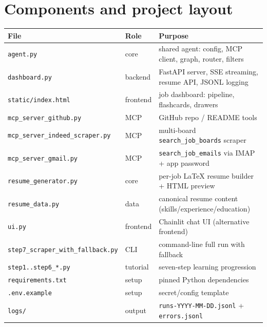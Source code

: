 \documentclass[11pt,a4paper]{article}
\newcommand{\file}[1]{\texttt{\small #1}}
\newcommand{\tool}[1]{\texttt{#1}}
\begin{document}
\section{Components and project layout}
\label{sec:files}

\begin{center}
\begin{tabular}{@{}llp{7.4cm}@{}}
\toprule
\textbf{File} & \textbf{Role} & \textbf{Purpose}\\
\midrule
\file{agent.py} & core & shared agent: config, MCP client, graph, router, filters\\
\file{dashboard.py} & backend & FastAPI server, SSE streaming, resume API, JSONL logging\\
\file{static/index.html} & frontend & job dashboard: pipeline, flashcards, drawers\\
\file{mcp\_server\_github.py} & MCP & GitHub repo / README tools\\
\file{mcp\_server\_indeed\_scraper.py} & MCP & multi-board \tool{search\_job\_boards} scraper\\
\file{mcp\_server\_gmail.py} & MCP & \tool{search\_job\_emails} via IMAP + app password\\
\file{resume\_generator.py} & core & per-job LaTeX resume builder + HTML preview\\
\file{resume\_data.py} & data & canonical resume content (skills/experience/education)\\
\file{ui.py} & frontend & Chainlit chat UI (alternative frontend)\\
\file{step7\_scraper\_with\_fallback.py} & CLI & command-line full run with fallback\\
\file{step1..step6\_*.py} & tutorial & seven-step learning progression\\
\file{requirements.txt} & setup & pinned Python dependencies\\
\file{.env.example} & setup & secret/config template\\
\file{logs/} & output & \file{runs-YYYY-MM-DD.jsonl} + \file{errors.jsonl}\\
\bottomrule
\end{tabular}
\end{center}
\end{document}
